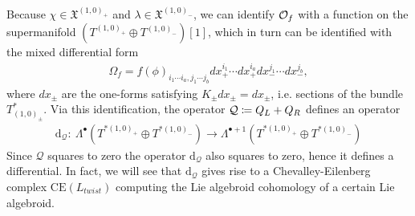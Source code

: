 \documentclass{article}
\newcommand{\XX}{\mathfrak{X}}
\newcommand{\QQ}{\mathcal{Q}}
\newcommand{\rd}{\mathrm{d}}
\theoremstyle{definition}
\theoremstyle{remark}
\begin{document}
Because $\chi \in \XX^{(1,0)_+}$ and $\lambda \in \XX^{(1,0)_-}$, we can identify ${\cal O}_f$ with a function on the supermanifold $(T^{(1,0)_+}\oplus T^{(1,0)_-})[1]$, which in turn can be identified with the mixed differential form
\begin{align*}
\Omega_f=f(\phi)_{i_1\cdots i_a,j_1\cdots j_b}dx^{i_1}_+\cdots dx^{i_a}_+ dx^{j_1}_- \cdots dx^{j_b}_-,
\end{align*}
where $dx_\pm$ are the one-forms satisfying $K_\pm dx_\pm=dx_\pm$, i.e. sections of the bundle $T^*_{(1,0)_\pm}$. Via this identification, the operator ${\cal Q}\coloneqq Q_L+Q_R$ defines an operator
\begin{align*}
\rd_\QQ:\ \Lambda^\bullet(T^{*(1,0)_+}\oplus T^{*(1,0)_-})\rightarrow \Lambda^{\bullet +1}(T^{*(1,0)_+}\oplus T^{*(1,0)_-})
\end{align*}
Since $\QQ$ squares to zero the operator $\rd_\QQ$ also squares to zero, hence it defines a differential. 
In fact, we will see that $\rd_\QQ$ gives rise to a Chevalley-Eilenberg complex $\text{CE}(L_{twist})$ computing the Lie algebroid cohomology of a certain Lie algebroid.
\end{document}
